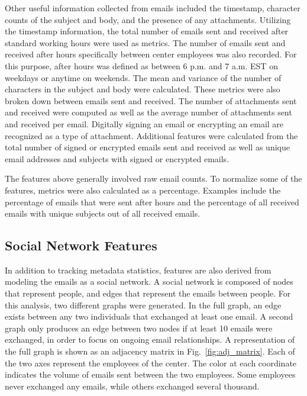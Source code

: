 \documentclass[10pt,twocolumn,conference]{IEEEtran}
\begin{document}
Other useful information collected from emails included the timestamp, character counts of the subject and body, and the presence of any attachments.
Utilizing the timestamp information, the total number of emails sent and received after standard working hours were used as metrics.
The number of emails sent and received after hours specifically between center employees was also recorded.
For this purpose, after hours was defined as between 6 p.m. and 7 a.m. EST on weekdays or anytime on weekends.
The mean and variance of the number of characters in the subject and body were calculated.
These metrics were also broken down between emails sent and received.
The number of attachments sent and received were computed as well as the average number of attachments sent and received per email.
Digitally signing an email or encrypting an email are recognized as a type of attachment.
Additional features were calculated from the total number of signed or encrypted emails sent and received as well as unique email addresses and subjects with signed or encrypted emails.

The features above generally involved raw email counts.
To normalize some of the features, metrics were also calculated as a percentage.
Examples include the percentage of emails that were sent after hours and the percentage of all received emails with unique subjects out of all received emails.

\subsection{Social Network Features}
In addition to tracking metadata statistics, features are also derived from modeling the emails as a social network.
A social network is composed of nodes that represent people, and edges that represent the emails between people.  For this analysis, two different graphs were generated.
In the full graph, an edge exists between any two individuals that exchanged at least one email.
A second graph only produces an edge between two nodes if at least 10 emails were exchanged, in order to focus on ongoing email relationships.
A representation of the full graph is shown as an adjacency matrix in Fig.~\ref{fig:adj_matrix}.
Each of the two axes represent the employees of the center.
The color at each coordinate indicates the volume of emails sent between the two employees.
Some employees never exchanged any emails, while others exchanged several thousand.
\end{document}
